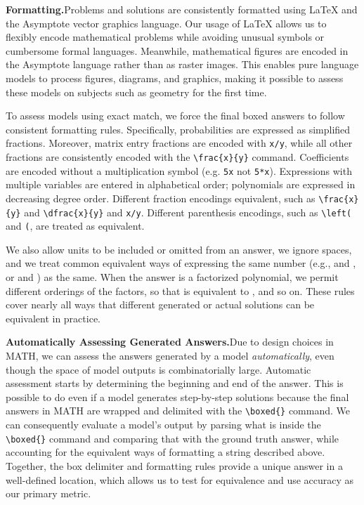 \documentclass{article}
\begin{document}
\textbf{Formatting.}\quad Problems and solutions are consistently formatted using \LaTeX{} and the Asymptote vector graphics language. Our usage of \LaTeX{} allows us to flexibly encode mathematical problems while avoiding unusual symbols or cumbersome formal languages. Meanwhile, mathematical figures are encoded in the Asymptote language rather than as raster images. 
This enables pure language models to process figures, diagrams, and graphics, making it possible to assess these models on subjects such as geometry for the first time. 

To assess models using exact match, we force the final boxed answers to follow consistent formatting rules.
Specifically, probabilities are expressed as simplified fractions. Moreover, matrix entry fractions are encoded with \verb|x/y|, while all other fractions are consistently encoded with the \verb|\frac{x}{y}| command. Coefficients are encoded without a multiplication symbol (e.g. \verb|5x| not \verb|5*x|). Expressions with multiple variables are entered in alphabetical order; polynomials are expressed in decreasing degree order. Different fraction encodings equivalent, such as \texttt{\textbackslash frac\{x\}\{y\}} and \texttt{\textbackslash dfrac\{x\}\{y\}} and \texttt{x/y}. Different parenthesis encodings, such as \texttt{\textbackslash left(} and \texttt{(}, are treated as equivalent.

We also allow units to be included or omitted from an answer, we ignore spaces, and we treat common equivalent ways of expressing the same number (e.g.,  and , or  and ) as the same. When the answer is a factorized polynomial, we permit different orderings of the factors, so that  is equivalent to , and so on. These rules cover nearly all ways that different generated or actual solutions can be equivalent in practice. 


\textbf{Automatically Assessing Generated Answers.}\quad Due to design choices in MATH, we can assess the answers generated by a model \emph{automatically}, even though the space of model outputs is combinatorially large. Automatic assessment starts by determining the beginning and end of the answer. This is possible to do even if a model generates step-by-step solutions because the final answers in MATH are wrapped and delimited with the \verb|\boxed{}| command. We can consequently evaluate a model's output by parsing what is inside the \verb|\boxed{}| command and comparing that with the ground truth answer, while accounting for the equivalent ways of formatting a string described above.
Together, the box delimiter and formatting rules provide a unique answer in a well-defined location, which allows us to test for equivalence and use accuracy as our primary metric.
\end{document}
